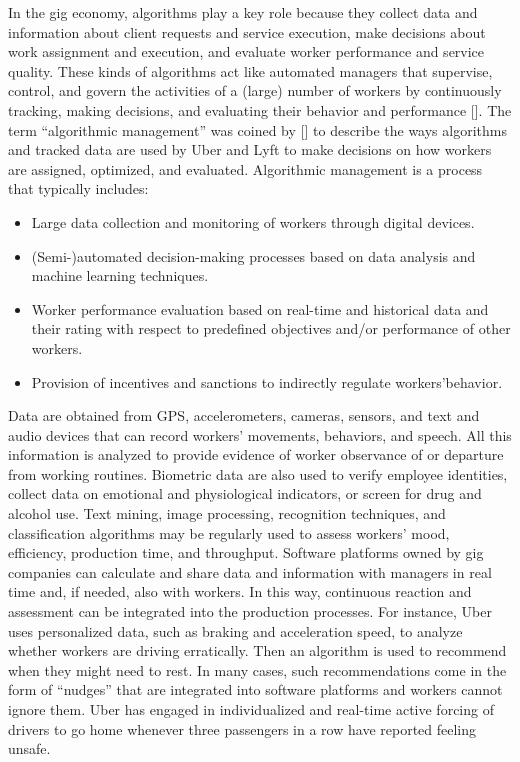 In the gig economy, algorithms play a key role because they collect data and information about client requests and service execution, make decisions about work assignment and execution, and evaluate worker performance and service quality. These kinds of algorithms act like automated managers that supervise, control, and govern the activities of a (large) number of workers by continuously tracking, making decisions, and evaluating their behavior and performance [\citealt{chap:6:Mohlmannetal:2021}]. The term ``algorithmic management'' was coined by \citeauthor{chap:6:Leeetal:2015} [\citeyear{chap:6:Leeetal:2015}] to describe the ways algorithms and tracked data are used by Uber and Lyft to make decisions on how workers are assigned, optimized, and evaluated. Algorithmic management is a process that typically includes:

\begin{itemize}
\item Large data collection and monitoring of workers through digital devices.

\item (Semi-)automated decision-making processes based on data analysis and machine learning techniques.

\item Worker performance evaluation based on real-time and historical data and their rating with respect to predefined objectives and/or performance of other workers.

\item Provision of incentives and sanctions to indirectly regulate workers'\break behavior\vadjust{\vspace*{10pt}\pagebreak}.
\end{itemize}

Data are obtained from GPS, accelerometers, cameras, sensors, and text and audio devices that can record workers' movements, behaviors, and speech. All this information is analyzed to provide evidence of worker observance of or departure from working routines. Biometric data are also used to verify employee identities, collect data on emotional and physiological indicators, or screen for drug and alcohol use. Text mining, image processing, recognition techniques, and classification algorithms may be regularly used to assess workers' mood, efficiency, production time, and throughput. Software platforms owned by gig companies can calculate and share data and information with managers in real time and, if needed, also with workers. In this way, continuous reaction and assessment can be integrated into the production processes. For instance, Uber uses personalized data, such as braking and acceleration speed, to analyze whether workers are driving erratically. Then an algorithm is used to recommend when they might need to rest. In many cases, such recommendations come in the form of ``nudges'' that are integrated into software platforms and workers cannot ignore them. Uber has engaged in individualized and real-time active forcing of drivers to go home whenever three passengers in a row have reported feeling unsafe.

